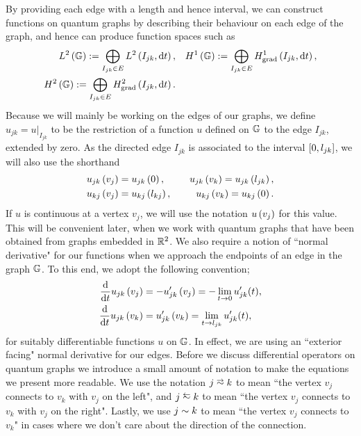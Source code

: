 By providing each edge with a length and hence interval, we can construct functions on quantum graphs by describing their behaviour on each edge of the graph, and hence can produce function spaces such as
\begin{subequations} \label{eq:GraphFuncSpaces}
	\begin{align}
		L^2\left( \mathbb{G} \right) := \bigoplus_{I_{jk}\in E} L^{2}\left( I_{jk},\mathrm{d}t \right),
		&\quad H^1\left( \mathbb{G} \right) := \bigoplus_{I_{jk}\in E} H^1_\mathrm{grad}\left( I_{jk}, \mathrm{d}t \right), \\
		H^2\left( \mathbb{G} \right) := \bigoplus_{I_{jk}\in E} H^2_\mathrm{grad}\left( I_{jk}, \mathrm{d} t \right). &
	\end{align}
\end{subequations}
Because we will mainly be working on the edges of our graphs, we define $u_{jk} = u\vert_{I_{jk}}$ to be the restriction of a function $u$ defined on $\mathbb{G}$ to the edge $I_{jk}$, extended by zero.
As the directed edge $I_{jk}$ is associated to the interval $\left[ 0,l_{jk} \right]$, we will also use the shorthand
\begin{align*}
	u_{jk}\left( v_j \right) &= u_{jk}\left( 0 \right), &\quad
	u_{jk}\left( v_k \right) = u_{jk}\left( l_{jk} \right), \\
	u_{kj}\left( v_j \right) &= u_{kj}\left( l_{kj} \right), &\quad
	u_{kj}\left( v_k \right) = u_{kj}\left( 0 \right).
\end{align*}
If $u$ is continuous at a vertex $v_j$, we will use the notation $u\left( v_j \right)$ for this value.
This will be convenient later, when we work with quantum graphs that have been obtained from graphs embedded in $\mathbb{R}^2$.
We also require a notion of ``normal derivative" for our functions when we approach the endpoints of an edge in the graph $\mathbb{G}$.
To this end, we adopt the following convention;
\begin{align*}
	\dfrac{\mathrm{d}}{\mathrm{d}t}u_{jk}\left( v_j \right) &= -u_{jk}'\left( v_j \right) = -\lim_{t\rightarrow0}u_{jk}'(t), \\
	\dfrac{\mathrm{d}}{\mathrm{d}t}u_{jk}\left( v_k \right) &= u_{jk}'\left( v_k \right) = \lim_{t\rightarrow l_{jk}}u_{jk}'(t),
\end{align*}
for suitably differentiable functions $u$ on $\mathbb{G}$. 
In effect, we are using an ``exterior facing" normal derivative for our edges. 
Before we discuss differential operators on quantum graphs we introduce a small amount of notation to make the equations we present more readable.
We use the notation $j\conLeft k$ to mean ``the vertex $v_j$ connects to $v_k$ with $v_j$ on the left", and $j\conRight k$ to mean ``the vertex $v_j$ connects to $v_k$ with $v_j$ on the right".
Lastly, we use $j\sim k$ to mean ``the vertex $v_j$ connects to $v_k$" in cases where we don't care about the direction of the connection.
